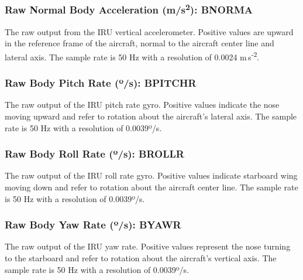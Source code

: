 \documentclass[
]{book}
\begin{document}
\hypertarget{bnorma}{%
\subsubsection*{\texorpdfstring{Raw Normal Body Acceleration (m/s\textsuperscript{2}): BNORMA}{Raw Normal Body Acceleration (m/s2): BNORMA}}\label{bnorma}}

The raw output from the IRU vertical accelerometer. Positive values are upward in the reference frame of the aircraft, normal to the aircraft center line and lateral axis. The sample rate is 50 Hz with a resolution of 0.0024 m s\textsuperscript{-2}.

\hypertarget{bpitchr}{%
\subsubsection*{\texorpdfstring{Raw Body Pitch Rate ({º}/s): BPITCHR}{Raw Body Pitch Rate (º/s): BPITCHR}}\label{bpitchr}}

The raw output of the IRU pitch rate gyro. Positive values indicate the nose moving upward and refer to rotation about the aircraft's lateral axis. The sample rate is 50 Hz with a resolution of 0.0039{º}/s.

\hypertarget{brollr}{%
\subsubsection*{\texorpdfstring{Raw Body Roll Rate ({º}/s): BROLLR}{Raw Body Roll Rate (º/s): BROLLR}}\label{brollr}}

The raw output of the IRU roll rate gyro. Positive values indicate starboard wing moving down and refer to rotation about the aircraft center line. The sample rate is 50 Hz with a resolution of 0.0039{º}/s.

\hypertarget{byawr}{%
\subsubsection*{\texorpdfstring{Raw Body Yaw Rate ({º}/s): BYAWR}{Raw Body Yaw Rate (º/s): BYAWR}}\label{byawr}}

The raw output of the IRU yaw rate. Positive values represent the nose turning to the starboard and refer to rotation about the aircraft's vertical axis. The sample rate is 50 Hz with a resolution of 0.0039{º}/s.
\end{document}
